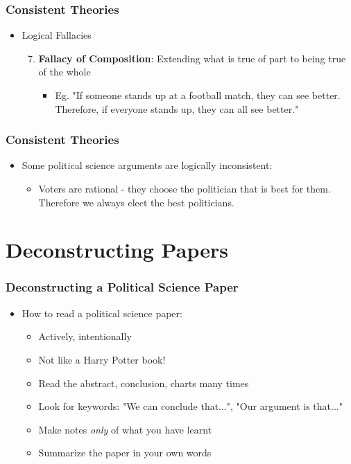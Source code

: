 \documentclass[xcolor=x11names,compress]{beamer}\usepackage[]{graphicx}\usepackage[]{color}
\renewcommand{\(}{\begin{columns}}
\renewcommand{\)}{\end{columns}}
\newcommand{\<}[1]{\begin{column}{#1}}
\renewcommand{\>}{\end{column}}
\begin{document}
\begin{frame}
\frametitle{Consistent Theories}
\begin{itemize}
\item Logical Fallacies
\begin{enumerate}
\setcounter{enumi}{6}
\item \textbf{Fallacy of Composition}: Extending what is true of part to being true of the whole
\pause
\begin{itemize}
\item Eg. "If someone stands up at a football match, they can see better. Therefore, if everyone stands up, they can all see better."
\end{itemize}
\end{enumerate}
\end{itemize}
\end{frame}

\begin{frame}
\frametitle{Consistent Theories}
\begin{itemize}
\item Some political science arguments are logically inconsistent:
\begin{itemize}
\item Voters are rational - they choose the politician that is best for them. Therefore we always elect the best politicians.
\end{itemize}
\end{itemize}
\end{frame}

\section{Deconstructing Papers}

\begin{frame}
\frametitle{Deconstructing a Political Science Paper}
\begin{itemize}
\item How to read a political science paper:
\pause
\begin{itemize}
\item Actively, intentionally
\pause
\item Not like a Harry Potter book!
\pause
\item Read the abstract, conclusion, charts many times
\pause
\item Look for keywords: "We can conclude that...", "Our argument is that..."
\pause
\item Make notes \textit{only} of what you have learnt
\pause
\item Summarize the paper in your own words
\end{itemize}
\end{itemize}
\end{frame}
\end{document}
